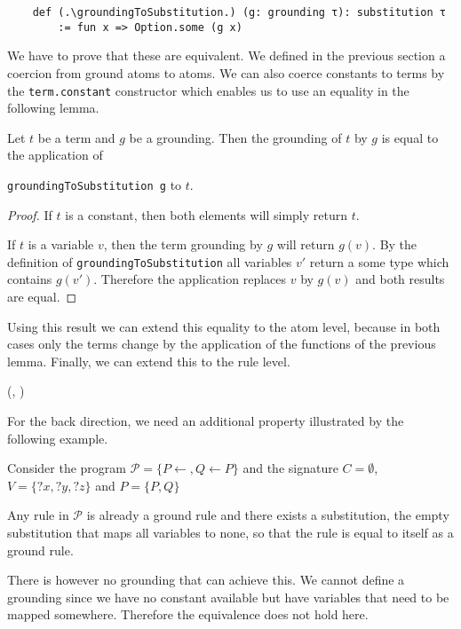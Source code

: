     \begin{lstlisting}
    def (.\groundingToSubstitution.) (g: grounding τ): substitution τ
        := fun x => Option.some (g x)
    \end{lstlisting}

    We have to prove that these are equivalent. We defined in the previous section a coercion from ground atoms to atoms. We can also coerce constants to terms by the \lstinline|term.constant| constructor which enables us to use an equality in the following lemma.

    \begin{lemma}[\groundingToSubsitutionEquivTerm]
        Let $t$ be a term and $g$ be a grounding. Then the grounding of $t$ by $g$ is equal to the application of
        
        \lstinline|groundingToSubstitution g| to $t$.
    \end{lemma}
    \begin{proof}
        If $t$ is a constant, then both elements will simply return $t$.

        If $t$ is a variable $v$, then the term grounding by $g$ will return $g(v)$. By the definition of \lstinline|groundingToSubstitution| all variables $v'$ return a some type which contains $g(v')$. Therefore the application replaces $v$ by $g(v)$ and both results are equal. 
    \end{proof}

    Using this result we can extend this equality to the atom level, because in both cases only the terms change by the application of the functions of the previous lemma. Finally, we can extend this to the rule level.
    
    \noindent(\groundingToSubsitutionEquivAtom, \groundingToSubsitutionEquivRule)

    For the back direction, we need an additional property illustrated by the following example.
    \begin{example}
        Consider the program $\mathcal{P} = \{P \leftarrow, Q \leftarrow P\}$ and the signature $C = \emptyset$, $V = \{?x,?y,?z \}$ and $P = \{P,Q\}$

        Any rule in $\mathcal{P}$ is already a ground rule and there exists a substitution, the empty substitution that maps all variables to none, so that the rule is equal to itself as a ground rule.
        
        There is however no grounding that can achieve this. We cannot define a grounding since we have no constant available but have variables that need to be mapped somewhere. Therefore the equivalence does not hold here.
    \end{example}

